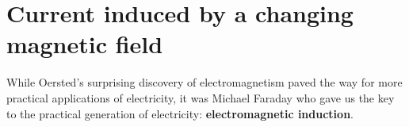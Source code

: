 \section{Current induced by a changing magnetic field}

While Oersted's surprising discovery of electromagnetism paved the
way for more practical applications of electricity, it was Michael
Faraday who gave us the key to the practical generation of
electricity: \textbf{electromagnetic induction}.

